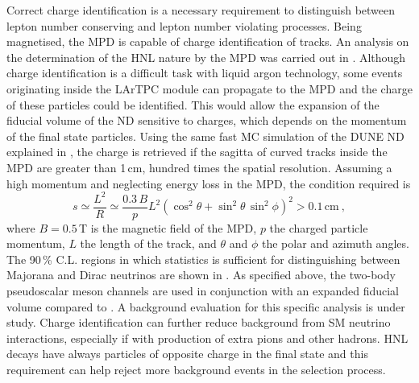 Correct charge identification is a necessary requirement to distinguish between %
lepton number conserving and lepton number violating processes.
Being magnetised, the MPD is capable of charge identification of tracks.
An analysis on the determination of the HNL nature by the MPD was carried out in .
Although charge identification is a difficult task with liquid argon technology, %
some events originating inside the LArTPC module can propagate to the MPD and the charge of these particles could be identified.
This would allow the expansion of the fiducial volume of the ND sensitive to charges, which depends on the momentum of the final state particles.
Using the same fast MC simulation of the DUNE ND explained in , %
the charge is retrieved if the sagitta of curved tracks inside the MPD are greater than 1\,cm, %
hundred times the spatial resolution.
Assuming a high momentum and neglecting energy loss in the MPD, the condition required is 
\begin{equation}
	s \simeq \frac{L^2}{R} \simeq \frac{0.3\,B}{p} L^2 %
	(\cos^2\theta + \sin^2\theta\, \sin^2\phi)^2 > 0.1\,\text{cm}\ ,
\end{equation}
where $B = 0.5$\,T is the magnetic field of the MPD, $p$ the charged particle momentum, %
$L$ the length of the track, and $\theta$ and $\phi$ the polar and azimuth angles.
The 90\,\% C.L. regions in which statistics is sufficient for distinguishing between Majorana and Dirac neutrinos %
are shown in .
As specified above, the two-body pseudoscalar meson channels are used in conjunction with an expanded fiducial volume %
compared to .
A background evaluation for this specific analysis is under study.
Charge identification can further reduce background from SM neutrino interactions, %
especially if with production of extra pions and other hadrons.
HNL decays have always particles of opposite charge in the final state and this requirement %
can help reject more background events in the selection process.
